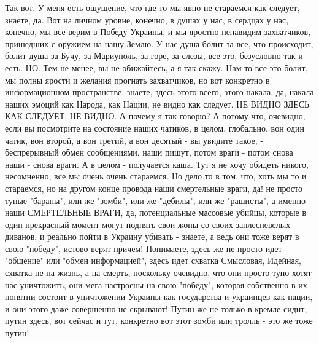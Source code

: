Так вот. У меня есть ощущение, что где-то мы явно не стараемся как следует,
знаете, да.  Вот на личном уровне, конечно, в душах у нас, в сердцах у нас,
конечно, мы все верим в Победу Украины, и мы яростно ненавидим захватчиков,
пришедших с оружием на нашу Землю. У нас душа болит за все, что происходит,
болит душа за Бучу, за Мариуполь, за горе, за слезы, все это, безусловно так и
есть. НО. Тем не менее, вы не обижайтесь, а я так скажу. Нам то все это болит,
мы полны ярости и желания прогнать захватчиков, но вот конкретно в
информационном пространстве, знаете, здесь этого всего, этого накала, да,
накала наших эмоций как Народа, как Нации, не видно как следует. НЕ ВИДНО ЗДЕСЬ
КАК СЛЕДУЕТ, НЕ ВИДНО.  А почему я так говорю? А потому что, очевидно, если вы
посмотрите на состояние наших чатиков, в целом, глобально, вон один чатик, вон
второй, а вон третий, а вон десятый - вы увидите такое, - беспрерывный обмен
сообщениями, наши пишут, потом враги - потом снова наши - снова враги. А в
целом - получается каша. Тут я не хочу обидеть никого, несомненно, все мы очень
очень стараемся. Но дело то в том, что, хоть мы то и стараемся, но на другом
конце провода наши смертельные враги, да! не просто тупые "бараны", или же
"зомби", или же "дебилы", или же "рашисты", а именно наши СМЕРТЕЛЬНЫЕ ВРАГИ,
да, потенциальные массовые убийцы, которые в один прекрасный момент могут
поднять свои жопы со своих заплесневелых диванов, и реально пойти в Украину
убивать - знаете, а ведь они тоже верят в свою "победу", истово верят причем!
Понимаете, здесь же не просто идет "общение" или "обмен информацией", здесь
идет схватка Смысловая, Идейная, схватка не на жизнь, а на смерть, поскольку
очевидно, что они просто тупо хотят нас уничтожить, они мега настроены на свою
"победу", которая собственно в их понятии состоит в уничтожении Украины как
государства и украинцев как нации, и они этого даже совершенно не скрывают!
Путин же не только в кремле сидит, путин здесь, вот сейчас и тут, конкретно вот
этот зомби или тролль - это же тоже путин!


